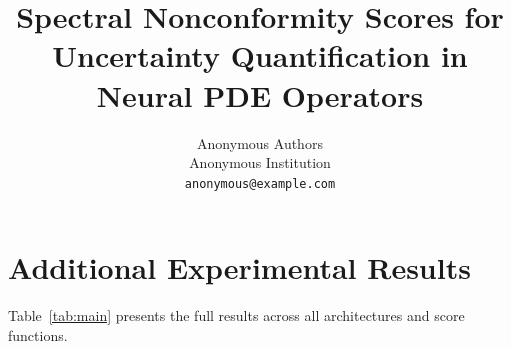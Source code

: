 \documentclass{article}
\title{Spectral Nonconformity Scores for Uncertainty Quantification in Neural PDE Operators}
\author{%
  Anonymous Authors \\
  Anonymous Institution \\
  \texttt{anonymous@example.com}
}
\begin{document}
\maketitle












\appendix

\section{Additional Experimental Results}
\label{app:experiments}

Table~\ref{tab:main} presents the full results across all architectures and score functions.


\end{document}
